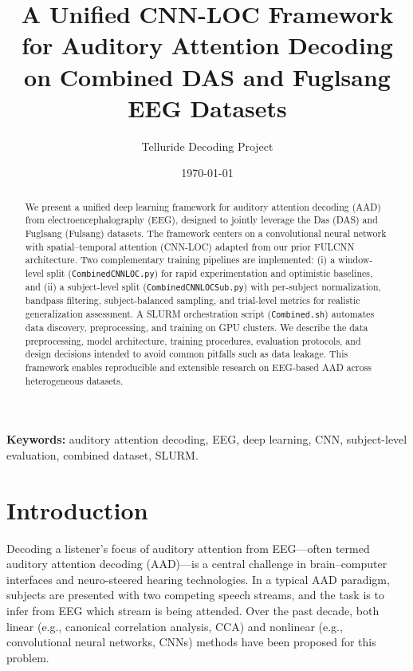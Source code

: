 \documentclass[11pt,a4paper]{article}
\title{\textbf{A Unified CNN-LOC Framework for Auditory Attention Decoding\\on Combined DAS and Fuglsang EEG Datasets}}
\author{Telluride Decoding Project}
\date{\today}
\newcommand{\py}[1]{\texttt{#1}}
\begin{document}
\maketitle

\begin{abstract}
We present a unified deep learning framework for auditory attention decoding (AAD) from electroencephalography (EEG), designed to jointly leverage the Das (DAS) and Fuglsang (Fulsang) datasets. The framework centers on a convolutional neural network with spatial--temporal attention (CNN-LOC) adapted from our prior FULCNN architecture. Two complementary training pipelines are implemented: (i) a window-level split (\py{CombinedCNNLOC.py}) for rapid experimentation and optimistic baselines, and (ii) a subject-level split (\py{CombinedCNNLOCSub.py}) with per-subject normalization, bandpass filtering, subject-balanced sampling, and trial-level metrics for realistic generalization assessment. A SLURM orchestration script (\py{Combined.sh}) automates data discovery, preprocessing, and training on GPU clusters. We describe the data preprocessing, model architecture, training procedures, evaluation protocols, and design decisions intended to avoid common pitfalls such as data leakage. This framework enables reproducible and extensible research on EEG-based AAD across heterogeneous datasets.
\end{abstract}

\noindent\textbf{Keywords:} auditory attention decoding, EEG, deep learning, CNN, subject-level evaluation, combined dataset, SLURM.

\section{Introduction}
\label{sec:intro}

Decoding a listener's focus of auditory attention from EEG---often termed auditory attention decoding (AAD)---is a central challenge in brain--computer interfaces and neuro-steered hearing technologies. In a typical AAD paradigm, subjects are presented with two competing speech streams, and the task is to infer from EEG which stream is being attended. Over the past decade, both linear (e.g., canonical correlation analysis, CCA) and nonlinear (e.g., convolutional neural networks, CNNs) methods have been proposed for this problem.
\end{document}
